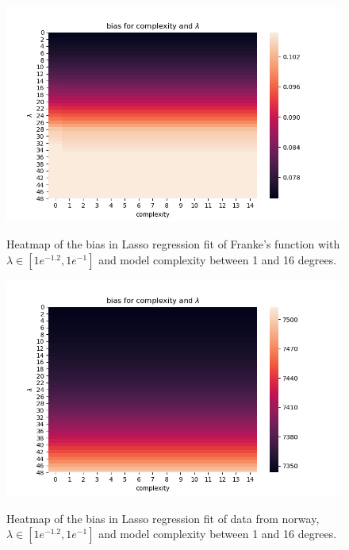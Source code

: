 \documentclass[ 12pt, a4paper ]{article}
\begin{document}
\begin{figure}[H]
\includegraphics[scale=0.7]{frankelassobiasheatmap.png}
\label{fig:frankelassobiasheatmap}
\caption{
    Heatmap of the bias in Lasso regression fit of Franke's function with 
    $\lambda\in [1e^{-1.2}, 1e^{-1}]$ and model complexity between 1 and 16 degrees.
}
\end{figure}

\begin{figure}
\includegraphics[scale=0.7]{nordatalassobiasheatmap.png}
\label{fig:nordatalassobiasheatmap}
\caption{
    Heatmap of the bias in Lasso regression fit of data from norway, 
    $\lambda\in [1e^{-1.2}, 1e^{-1}]$ and  model complexity between 1 and 16 degrees.
}
\end{figure}

\end{document}
